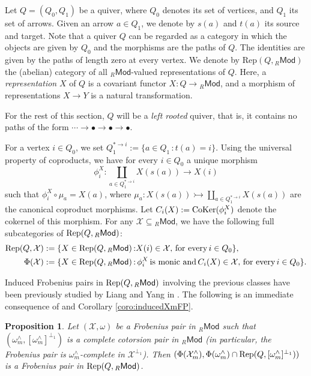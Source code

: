 \documentclass[10pt,reqno]{amsart}
\numberwithin{equation}{section}
\newtheorem{proposition}[definition]{Proposition}
\theoremstyle{remark}
\newcommand{\X}{\mathcal{X}}
\begin{document}
Let $Q = (Q_0,Q_1)$ be a quiver, where $Q_0$ denotes its set of vertices, and $Q_1$ its set of arrows. Given an arrow $a \in Q_1$, we denote by $s(a)$ and $t(a)$ its source and target. Note that a quiver $Q$ can be regarded as a category in which the objects are given by $Q_0$ and the morphisms are the paths of $Q$. The identities are given by the paths of length zero at every vertex. We denote by $\mathrm{Rep}(Q,{}_R\mathsf{Mod})$ the (abelian) category of all ${}_R\mathsf{Mod}$-valued representations of $Q$. Here, a \emph{representation} $X$ of $Q$ is a covariant functor $X \colon Q \to {}_R\mathsf{Mod}$, and a morphism of representations $X \to Y$ is a natural transformation. 

For the rest of this section, $Q$ will be a \emph{left rooted} quiver, that is, it contains no paths of the form $\cdots \to \bullet \to \bullet \to \bullet$. 

For a vertex $i \in Q_0$, we set $Q_1^{\ast \to i} := \{ a \in Q_1 \, \text{:} \, t(a) = i \}$. Using the universal property of coproducts, we have for every $i \in Q_0$ a unique morphism 
\[
\phi_i^X \colon \coprod_{a \in Q_1^{\ast \to i }} X(s(a)) \to X(i)
\]
such that $\phi_i^X \circ \mu_a = X(a)$, where $\mu_a \colon X(s(a)) \rightarrowtail \coprod_{a \in Q_1^{\ast \to i }} X(s(a))$ are the canonical coproduct morphisms. Let $C_i(X) := {\rm CoKer}(\phi_i^X)$ denote the cokernel of this morphism. For any $\X \subseteq {}_R\mathsf{Mod}$, we have the following full subcategories of ${\rm Rep}(Q,{}_R\mathsf{Mod})$:
\begin{align*}
{\rm Rep}(Q,\X) & := \{ X \in {\rm Rep}(Q,{}_R\mathsf{Mod}) \, \text{:} X(i) \in \X, \, \text{for every} \, i \in Q_0 \}, \\
\Phi(\X) & := \{ X \in {\rm Rep}(Q,{}_R\mathsf{Mod}) \, \text{:} \, \phi^X_i \, \text{is monic and} \, C_i(X) \in \X, \, \text{for every} \, i \in Q_0 \}.
\end{align*}

Induced Frobenius pairs in ${\rm Rep}(Q,{}_R\mathsf{Mod})$ involving the previous classes have been previously studied by Liang and Yang in \cite[\S 4]{LiangYangConstructions}. The following is an immediate consequence of \cite[Thm. 4.5]{LiangYangConstructions} and Corollary \ref{coro:inducedXmFP}. \\


\begin{proposition}\label{coro:Rep_omega_complete}
Let $(\X,\omega)$ be a Frobenius pair in ${}_R\mathsf{Mod}$ such that $(\omega^{\wedge}_m,[\omega^{\wedge}_m]^{\perp_1})$ is a complete cotorsion pair in ${}_R\mathsf{Mod}$ (in particular, the Frobenius pair is $\omega^{\wedge}_m$-complete in $\X^{\perp_1}$). Then $(\Phi(\X^\wedge_m), \Phi(\omega^\wedge_m) \cap {\rm Rep}(Q,[\omega^\wedge_m]^{\perp_1}))$ is a Frobenius pair in ${\rm Rep}(Q,{}_R\mathsf{Mod})$.  
\end{proposition}
\end{document}
